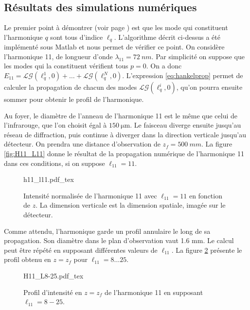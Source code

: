 \subsection{Résultats des simulations numériques}

Le premier point à démontrer (voir page \pageref{enum:properties}) est que les mode qui constituent l'harmonique $q$ sont tous d'indice $\ell_q$. L'algorithme décrit ci-dessus a été implémenté sous Matlab et nous permet de vérifier ce point. On considère l'harmonique 11, de longueur d'onde $\lambda_{11}=\SI{72}{nm}$. Par simplicité on suppose que les modes qui la constituent vérifient tous $p=0$. On a donc $E_{11} = \mathcal{LG}(\ell_q^1,0)+\ldots+\mathcal{LG}(\ell_q^N,0)$. L'expression \ref{eq:hankelprop} permet de calculer la propagation de chacun des modes $\mathcal{LG}(\ell_q^i,0)$, qu'on pourra ensuite sommer pour obtenir le profil de l'harmonique. \par
Au foyer, le diamètre de l'anneau de l'harmonique 11 est le même que celui de l'infrarouge, que l'on choisit égal à $\SI{150}{\micro\m}$. Le faisceau diverge ensuite jusqu'au réseau de diffraction, puis continue à diverger dans la direction verticale jusqu'au détecteur. On prendra une distance d'observation de $z_f=\SI{500}{mm}$. La figure \ref{fig:H11_L11} donne le résultat de la propagation numérique de l'harmonique 11 dans ces conditions, si on suppose $\ell_{11}=11$.
\begin{figure}[!ht]
\centering
\def\svgwidth{.5\columnwidth}
{h11_l11.pdf_tex}
\caption{Intensité normalisée de l'harmonique 11 avec $\ell_{11} = 11$ en fonction de $z$. La dimension verticale est la dimension spatiale, imagée sur le détecteur.}
\label{Fig:H11_L11}
\end{figure}
Comme attendu, l'harmonique garde un profil annulaire le long de sa propagation. Son diamètre dans le plan d'observation vaut 1.6 mm. Le calcul peut être répété en supposant différentes valeurs de $\ell_{11}$. La figure \ref{Fig:H11_L8-25} présente le profil obtenu en $z=z_f$ pour $\ell_{11}=8\ldots 25$.

\begin{figure}[!ht]
\centering
\def\svgwidth{.7\columnwidth}
{H11_L8-25.pdf_tex}
\caption{Profil d'intensité en $z=z_f$ de l'harmonique 11 en supposant $\ell_{11} = 8-25$.}
\label{Fig:H11_L8-25}
\end{figure}

